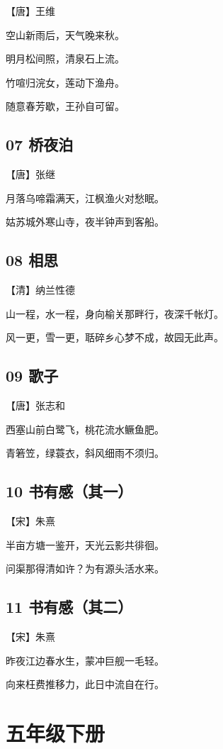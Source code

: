 \documentclass[a6paper, 12pt]{article}
\begin{document}
【唐】王维

空山新雨后，天气晚来秋。

明月松间照，清泉石上流。

竹喧归浣女，莲动下渔舟。

随意春芳歇，王孙自可留。

\subsection*{07 桥夜泊}

【唐】张继

月落乌啼霜满天，江枫渔火对愁眠。

姑苏城外寒山寺，夜半钟声到客船。

\subsection*{08 相思}

【清】纳兰性德

山一程，水一程，身向榆关那畔行，夜深千帐灯。

风一更，雪一更，聒碎乡心梦不成，故园无此声。

\subsection*{09 歌子}

【唐】张志和

西塞山前白鹭飞，桃花流水鳜鱼肥。

青箬笠，绿蓑衣，斜风细雨不须归。

\subsection*{10 书有感（其一）}

【宋】朱熹

半亩方塘一鉴开，天光云影共徘徊。

问渠那得清如许？为有源头活水来。

\subsection*{11 书有感（其二）}

【宋】朱熹

昨夜江边春水生，蒙冲巨舰一毛轻。

向来枉费推移力，此日中流自在行。

\newpage

\section*{五年级下册}
\end{document}
